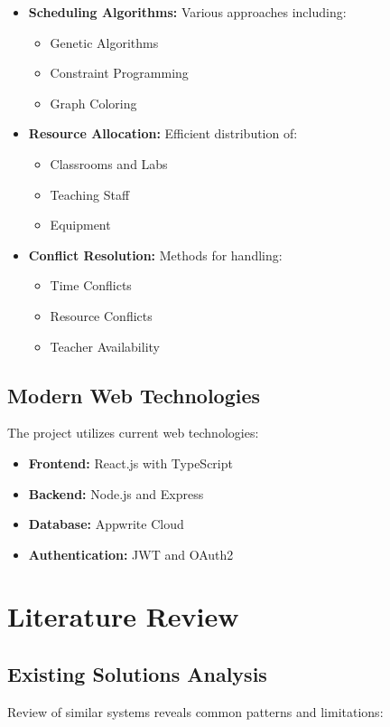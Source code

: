 \documentclass[12pt,a4paper]{report}
\begin{document}
\begin{itemize}
    \item \textbf{Scheduling Algorithms:} Various approaches including:
        \begin{itemize}
            \item Genetic Algorithms
            \item Constraint Programming
            \item Graph Coloring
        \end{itemize}
    \item \textbf{Resource Allocation:} Efficient distribution of:
        \begin{itemize}
            \item Classrooms and Labs
            \item Teaching Staff
            \item Equipment
        \end{itemize}
    \item \textbf{Conflict Resolution:} Methods for handling:
        \begin{itemize}
            \item Time Conflicts
            \item Resource Conflicts
            \item Teacher Availability
        \end{itemize}
\end{itemize}

\subsection{Modern Web Technologies}
The project utilizes current web technologies:

\begin{itemize}
    \item \textbf{Frontend:} React.js with TypeScript
    \item \textbf{Backend:} Node.js and Express
    \item \textbf{Database:} Appwrite Cloud
    \item \textbf{Authentication:} JWT and OAuth2
\end{itemize}

\section{Literature Review}
\subsection{Existing Solutions Analysis}
Review of similar systems reveals common patterns and limitations:
\end{document}
